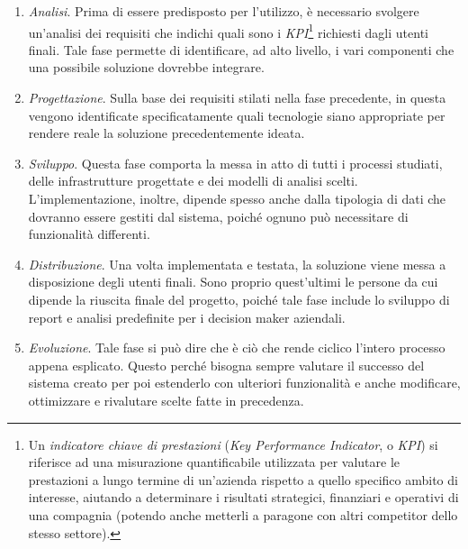 \begin{enumerate}
    \item \textit{Analisi}. Prima di essere predisposto per l'utilizzo, è necessario svolgere un'analisi dei requisiti che indichi quali sono i \textit{KPI}\footnote{Un \textit{indicatore chiave di prestazioni} (\textit{Key Performance Indicator}, o \textit{KPI}) si riferisce ad una misurazione quantificabile utilizzata per valutare le prestazioni a lungo termine di un'azienda rispetto a quello specifico ambito di interesse, aiutando a determinare i risultati strategici, finanziari e operativi di una compagnia (potendo anche metterli a paragone con altri competitor dello stesso settore)\cite{investopedia_kpi}.} richiesti dagli utenti finali. Tale fase permette di identificare, ad alto livello, i vari componenti che una possibile soluzione dovrebbe integrare.
    \item \textit{Progettazione}. Sulla base dei requisiti stilati nella fase precedente, in questa vengono identificate specificatamente quali tecnologie siano appropriate per rendere reale la soluzione precedentemente ideata.
    \item \textit{Sviluppo}. Questa fase comporta la messa in atto di tutti i processi studiati, delle infrastrutture progettate e dei modelli di analisi scelti. L'implementazione, inoltre, dipende spesso anche dalla tipologia di dati che dovranno essere gestiti dal sistema, poiché ognuno può necessitare di funzionalità differenti.
    \item \textit{Distribuzione}. Una volta implementata e testata, la soluzione viene messa a disposizione degli utenti finali. Sono proprio quest'ultimi le persone da cui dipende la riuscita finale del progetto, poiché tale fase include lo sviluppo di report e analisi predefinite per i decision maker aziendali.
    \item \textit{Evoluzione}. Tale fase si può dire che è ciò che rende ciclico l'intero processo appena esplicato. Questo perché bisogna sempre valutare il successo del sistema creato per poi estenderlo con ulteriori funzionalità e anche modificare, ottimizzare e rivalutare scelte fatte in precedenza.
\end{enumerate}

